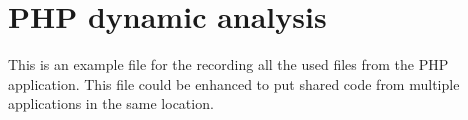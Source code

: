 \chapter{PHP dynamic analysis}
\label{ch:append.php}

This is an example file for the recording all the used files
from the PHP application. This file could be enhanced to put
shared code from multiple applications in the same location.

